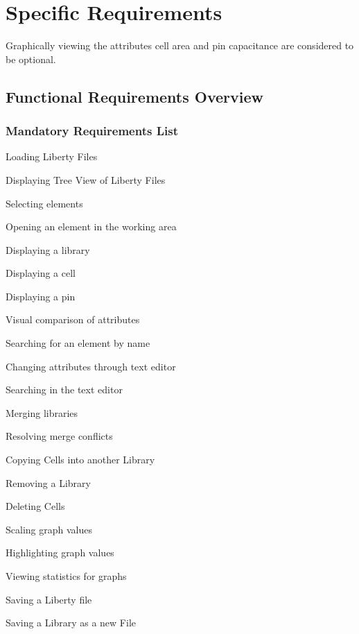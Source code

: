 \documentclass[10pt,a4paper]{report}
\begin{document}
\chapter{Specific Requirements}
Graphically viewing the attributes cell area and pin capacitance are considered to be optional.
\section{Functional Requirements Overview}
\subsection{Mandatory Requirements List}

\begin{FR}
    \item Loading Liberty Files \label{FR-1}
    \item Displaying Tree View of Liberty Files \label{FR-2}
    \item Selecting elements \label{FR-3}
    \item Opening an element in the working area \label{FR-4}
    \item Displaying a library \label{FR-5}
    \item Displaying a cell \label{FR-6}
    \item Displaying a pin \label{FR-7}
    \item Visual comparison of attributes \label{FR-8} %
    \item Searching for an element by name \label{FR-9}
    \item Changing attributes through text editor \label{FR-10}
    \item Searching in the text editor \label{FR-11}
    \item Merging libraries \label{FR-12}
    \item Resolving merge conflicts \label{FR-13}
    \item Copying Cells into another Library \label{FR-14}
    \item Removing a Library \label{FR-15}
    \item Deleting Cells \label{FR-16}
    \item Scaling graph values \label{FR-17}
    \item Highlighting graph values \label{FR-18}
    \item Viewing statistics for graphs \label{FR-19}
    \item Saving a Liberty file \label{FR-20}
    \item Saving a Library as a new File \label{FR-21}
\end{FR}
\end{document}
